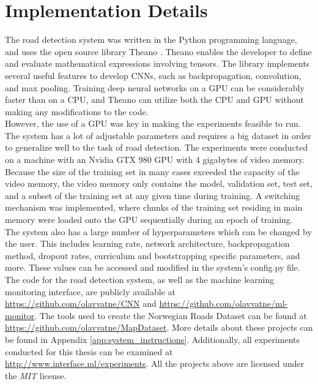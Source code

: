 \section{Implementation Details}
\label{sec:methods_implementation_details}
The road detection system was written in the Python programming language, and uses the open source library Theano \citep{bergstra_theano}. Theano enables the developer to define and evaluate mathematical expressions involving tensors. The library implements several useful features to develop \ac{CNN}s, such as backpropagation, convolution, and max pooling. Training deep neural networks on a \ac{GPU} can be considerably faster than on a \ac{CPU}, and Theano can utilize both the \ac{CPU} and \ac{GPU} without making any modifications to the code.\\

However, the use of a \ac{GPU} was key in making the experiments feasible to run. The system has a lot of adjustable parameters and requires a big dataset in order to generalize well to the task of road detection. The experiments were conducted on a machine with an Nvidia GTX 980 \ac{GPU} with 4 gigabytes of video memory. \\

Because the size of the training set in many cases exceeded the capacity of the video memory, the video memory only contains the model, validation set, test set, and a subset of the training set at any given time during training. A switching mechanism was implemented, where chunks of the training set residing in main memory were loaded onto the \ac{GPU} sequentially during an epoch of training.\\

The system also has a large number of hyperparameters which can be changed by the user. This includes learning rate, network architecture, backpropagation method, dropout rates, curriculum and bootstrapping specific parameters, and more. These values can be accessed and modified in the system's config.py file. \\

The code for the road detection system, as well as the machine learning monitoring interface, are publicly available at 
\url{https://github.com/olavvatne/CNN} and \url{https://github.com/olavvatne/ml-monitor}. The tools used to create the Norwegian Roads Dataset can be found at \url{https://github.com/olavvatne/MapDataset}. More details about these projects can be found in Appendix \ref{app:system_instructions}. Additionally, all experiments conducted for this thesis can be examined at \url{http://www.interface.ml/experiments}. All the projects above are licensed under the \emph{MIT} license.

